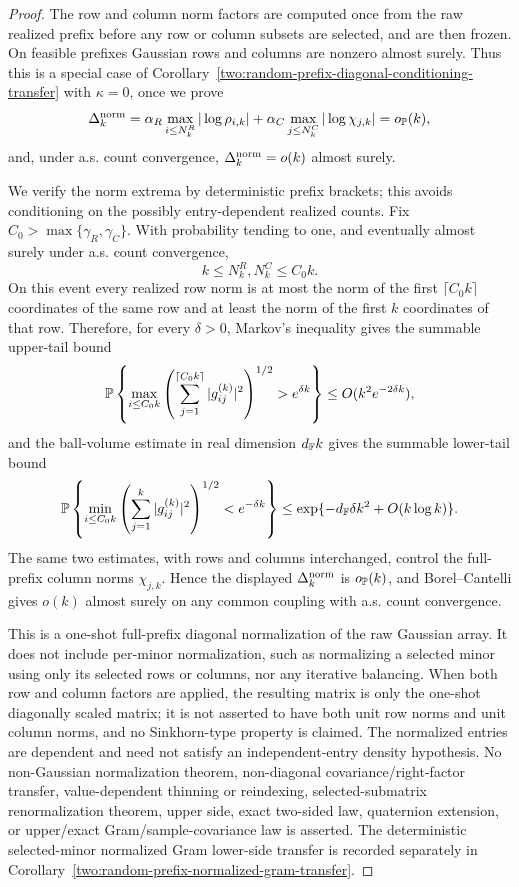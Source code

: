 \begin{proof}
The row and column norm factors are computed once from the raw realized prefix
before any row or column subsets are selected, and are then frozen.  On feasible
prefixes Gaussian rows and columns are nonzero almost surely.  Thus this is a
special case of Corollary~\ref{two:random-prefix-diagonal-conditioning-transfer}
with \(\kappa=0\), once we prove
\[
  \Delta_k^{\rm norm}
  =
  \alpha_R\max_{i\le N_k^R}|\log\rho_{i,k}|
  +\alpha_C\max_{j\le N_k^C}|\log\chi_{j,k}|
  =
  o_{\mathbb{P}}(k),
\]
and, under a.s. count convergence, \(\Delta_k^{\rm norm}=o(k)\) almost surely.

We verify the norm extrema by deterministic prefix brackets; this avoids
conditioning on the possibly entry-dependent realized counts.  Fix
\(C_0>\max\{\gamma_R,\gamma_C\}\).  With probability tending to one, and
eventually almost surely under a.s. count convergence,
\[
  k\le N_k^R,N_k^C\le C_0k .
\]
On this event every realized row norm is at most the norm of the first
\(\lceil C_0k\rceil\) coordinates of the same row and at least the norm of the
first \(k\) coordinates of that row.  Therefore, for every \(\delta>0\),
Markov's inequality gives the summable upper-tail bound
\[
  \mathbb{P}\left\{
  \max_{i\le C_0k}
  \left(\sum_{j=1}^{\lceil C_0k\rceil}|g_{ij}^{(k)}|^2\right)^{1/2}
  >e^{\delta k}\right\}
  \le O(k^2e^{-2\delta k}),
\]
and the ball-volume estimate in real dimension \(d_{\mathbb{F}} k\) gives the summable
lower-tail bound
\[
  \mathbb{P}\left\{
  \min_{i\le C_0k}
  \left(\sum_{j=1}^{k}|g_{ij}^{(k)}|^2\right)^{1/2}
  <e^{-\delta k}\right\}
  \le
  \exp\{-d_{\mathbb{F}}\delta k^2+O(k\log k)\}.
\]
The same two estimates, with rows and columns interchanged, control the
full-prefix column norms \(\chi_{j,k}\).  Hence the displayed
\(\Delta_k^{\rm norm}\) is \(o_{\mathbb{P}}(k)\), and Borel--Cantelli gives
\(o(k)\) almost surely on any common coupling with a.s. count convergence.

This is a one-shot full-prefix diagonal normalization of the raw Gaussian
array.  It does not include per-minor normalization, such as normalizing a
selected minor using only its selected rows or columns, nor any iterative
balancing.  When both row and column factors are applied, the resulting matrix
is only the one-shot diagonally scaled matrix; it is not asserted to have both
unit row norms and unit column norms, and no Sinkhorn-type property is claimed.
The normalized entries are dependent and need not satisfy an independent-entry
density hypothesis.  No non-Gaussian normalization theorem, non-diagonal
covariance/right-factor transfer, value-dependent thinning or reindexing,
selected-submatrix renormalization theorem, upper side, exact two-sided law,
quaternion extension, or upper/exact Gram/sample-covariance law is asserted.
The deterministic selected-minor normalized Gram lower-side transfer is
recorded separately in
Corollary~\ref{two:random-prefix-normalized-gram-transfer}.
\end{proof}

